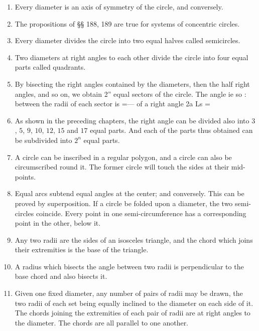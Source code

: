 \begin{enumerate}
\item Every diameter is an axis of symmetry of the circle, and conversely.

\item The propositions of §§ 188, 189 are true for systems of concentric
    circles.

\item Every diameter divides the circle into two equal halves called
    semicircles.

\item Two diameters at right angles to each other divide the circle into four
    equal parts called quadrants. 

\item By bisecting the right angles contained by the diameters, then the half
    right angles, and so on, we obtain 2” equal sectors of the circle. The angle
    ie so : between the radii of each sector is =— of a right angle 2a Ls =

\item As shown in the preceding chapters, the right angle can be divided also
    into $3$, $5$, $9$, $10$, $12$, $15$ and $17$ equal parts. And each of the
    parts thus obtained can be subdivided into $2^n$ equal parts.

\item A circle can be inscribed in a regular polygon, and a circle can also be
    circumscribed round it. The former circle will touch the sides at their
    mid-points.

\item Equal arcs subtend equal angles at the center; and conversely. This can be
    proved by superposition. If a circle be folded upon a diameter, the two
    semi-circles coincide. Every point in one semi-circumference has a
    corresponding point in the other, below it.

\item Any two radii are the sides of an isosceles triangle, and the chord which
    joins their extremities is the base of the triangle.

\item A radius which bisects the angle between two radii is perpendicular to the
    base chord and also bisects it.


\item Given one fixed diameter, any number of pairs of radii may be drawn, the
    two radii of each set being equally inclined to the diameter on each side of
    it.  The chords joining the extremities of each pair of radii are at right
    angles to the diameter.  The chords are all parallel to one another.


\end{enumerate}
